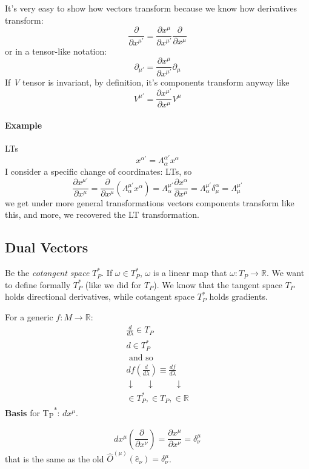 It's very easy to show how vectors transform because we know how derivatives transform:
\begin{equation}
\frac{\partial}{\partial  x^{\mu'}} = \frac{\partial  x^{\mu }}{\partial  x^{\mu '}} \frac{\partial}{\partial  x^{\mu }}
\end{equation}
or in a tensor-like notation:
\begin{equation}
\partial_{\mu '} = \frac{\partial  x^{\mu }}{\partial x^{\mu '}} \partial_{\mu }
\end{equation}
If \emph{V} tensor is invariant, by definition, it's components transform anyway like
\[
V^{\mu '} = \frac{\partial x^{\mu '}}{\partial x^{\mu }}V^{\mu }
\]

\paragraph{Example} LTs
\[
x^{\alpha '} = \Lambda^{\alpha '}_{\alpha }x^{\alpha }
\]
I consider a specific change of coordinates: LTs, so
\[
\frac{\partial x^{\mu '}}{\partial x^{\mu }} = \frac{\partial}{\partial x^{\mu }} \left( \Lambda^{\mu '}_{\alpha }x^{\alpha } \right) = \Lambda^{\mu '}_{\alpha } \frac{\partial x^{\alpha }}{\partial x^{\mu }} = \Lambda^{\mu '}_{\alpha } \delta^{\alpha }_{\mu } = \Lambda^{\mu '}_{\mu }
\]
we get under more general transformations vectors components transform like this, and more, we recovered the LT transformation.

\subsection{Dual Vectors}
Be the \emph{cotangent space} $T_{P}^{*}$. If $\omega \in T_{P}^{*}$, $\omega$ is a linear map that  $\omega : T_{P}\to \mathbb{R}$.
We want to define formally $T_{P}^{*}$ (like we did for $T_{P}$).
We know that the tangent space $T_{P}$ holds directional derivatives, while cotangent space $T_{P}^{*}$ holds gradients. \par
For a generic $f: M\to \mathbb{R}$:
\begin{gather*}
\frac{d}{d\lambda } \in T_{P} \\
d \in T_{P}^{*} \\
\text{ and so } \\
df \left( \frac{d}{d\lambda } \right) \equiv \frac{df}{d\lambda }\\
\downarrow \quad\; \downarrow \qquad \;\downarrow \\
\in T_{P}^{*}, \in T_{P}, \in \mathbb{R}
\end{gather*}
\textbf{Basis} for T\textsubscript{P}\textsuperscript{*}: $dx^{\mu }$.\par
\[
dx^{\mu } \left( \frac{\partial}{\partial x^{\nu }} \right) = \frac{\partial x^{\mu }}{\partial x^{\nu }} = \delta^{\mu }_{\nu }
\]
that is the same as the old $\hat{O}^{\left( \mu  \right)}\left( \hat{e}_{\nu } \right)=\delta^{\mu }_{\nu }$.

